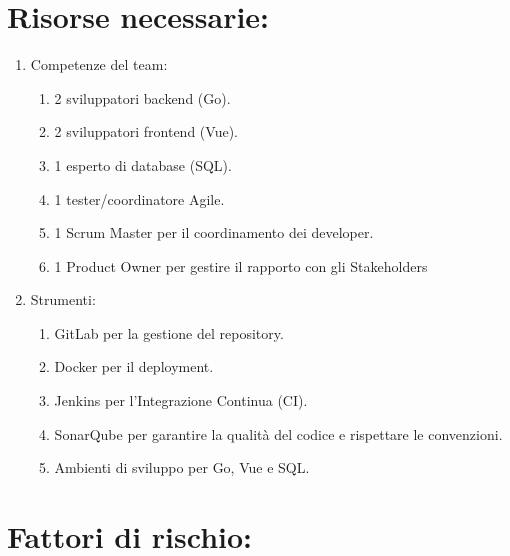 \documentclass{article}
\begin{document}
\section{Risorse necessarie:}

\begin{enumerate}
    \item Competenze del team:
        \begin{enumerate}
            \item 2 sviluppatori backend (Go).
            \item 2 sviluppatori frontend (Vue).
            \item 1 esperto di database (SQL).
            \item 1 tester/coordinatore Agile.
            \item 1 Scrum Master per il coordinamento dei developer.
            \item 1 Product Owner per gestire il rapporto con gli Stakeholders
        \end{enumerate}
    \item Strumenti:
        \begin{enumerate}
            \item GitLab per la gestione del repository.
            \item Docker per il deployment.
            \item Jenkins per l'Integrazione Continua (CI).
            \item SonarQube per garantire la qualità del codice e rispettare le convenzioni.
            \item Ambienti di sviluppo per Go, Vue e SQL.
        \end{enumerate}
\end{enumerate}

\section{Fattori di rischio:}
\end{document}
